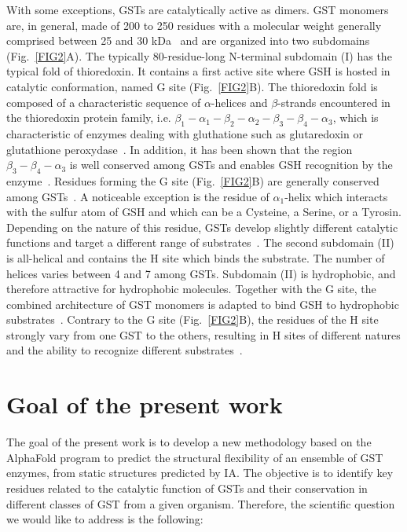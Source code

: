 With some exceptions, GSTs are catalytically active as dimers. GST monomers are, in general, made of 200 to 250 residues with a molecular weight generally comprised between 25 and 30 kDa~\cite{frova_glutathione_2006,board_glutathione_2013} and are organized into two subdomains (Fig.~\ref{FIG2}A). The typically 80-residue-long N-terminal subdomain (I) has the typical fold of thioredoxin. It contains a first active site where GSH is hosted in catalytic conformation, named G site (Fig.~\ref{FIG2}B). The thioredoxin fold is composed of a characteristic sequence of $\alpha$-helices and $\beta$-strands encountered in the thioredoxin protein family, i.e. $\beta_1-\alpha_1-\beta_2-\alpha_2-\beta_3-\beta_4-\alpha_3$, which is characteristic of enzymes dealing with gluthatione such as glutaredoxin or glutathione peroxydase~\cite{atkinson_atlas_2009}. In addition, it has been shown that the region $\beta_3-\beta_4-\alpha_3$ is well conserved among GSTs and enables GSH recognition by the enzyme~\cite{armstrong_structure_1997}. Residues forming the G site (Fig.~\ref{FIG2}B) are generally conserved among GSTs~\cite{board_glutathione_2013}. A noticeable exception is the residue of $\alpha_1$-helix which interacts with the sulfur atom of GSH and which can be a Cysteine, a Serine, or a Tyrosin. Depending on the nature of this residue, GSTs develop slightly different catalytic functions and target a different range of substrates~\cite{deponte_glutathione_2013}. The second subdomain (II) is all-helical and contains the H site which binds the substrate. The number of helices varies between 4 and 7 among GSTs. Subdomain (II) is hydrophobic, and therefore attractive for hydrophobic molecules. Together with the G site, the combined architecture of GST monomers is adapted to bind GSH to hydrophobic substrates~\cite{mannervik_glutathione_1988}. Contrary to the G site (Fig.~\ref{FIG2}B), the residues of the H site strongly vary from one GST to the others, resulting in H sites of different natures and the ability to recognize different substrates~\cite{cummins_multiple_2011}. 

\section{Goal of the present work}

The goal of the present work is to develop a new methodology based on the AlphaFold program to predict the structural flexibility of an ensemble of GST enzymes, from static structures predicted by IA. The objective is to identify key residues related to the catalytic function of GSTs and their conservation in different classes of GST from a given organism. Therefore, the scientific question we would like to address is the following:


